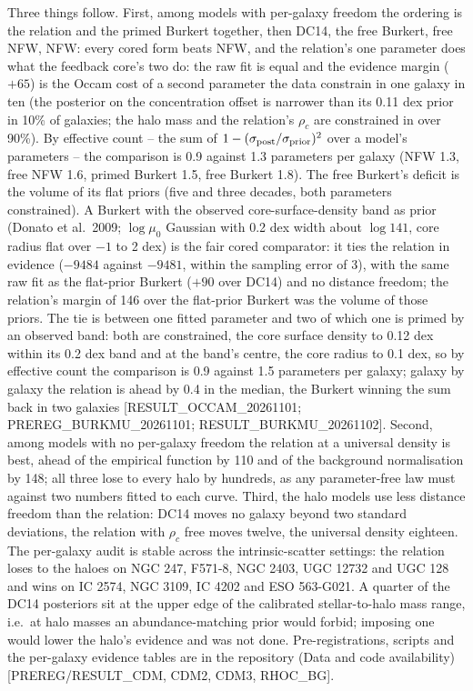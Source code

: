 \documentclass[
  10pt,
]{article}
\begin{document}
Three things follow. First, among models with per-galaxy freedom the ordering is the relation and the primed Burkert together, then DC14, the free Burkert, free NFW, NFW: every cored form beats NFW, and the relation's one parameter does what the feedback core's two do: the raw fit is equal and the evidence margin ($+65$) is the Occam cost of a second parameter the data constrain in one galaxy in ten (the posterior on the concentration offset is narrower than its 0.11 dex prior in 10\% of galaxies; the halo mass and the relation's $\rho_c$ are constrained in over 90\%). By effective count -- the sum of $1-(\sigma_{\rm post}/\sigma_{\rm prior})^2$ over a model's parameters -- the comparison is 0.9 against 1.3 parameters per galaxy (NFW 1.3, free NFW 1.6, primed Burkert 1.5, free Burkert 1.8). The free Burkert's deficit is the volume of its flat priors (five and three decades, both parameters constrained). A Burkert with the observed core-surface-density band as prior (Donato et al.~2009; $\log\mu_0$ Gaussian with 0.2 dex width about $\log 141$, core radius flat over $-1$ to 2 dex) is the fair cored comparator: it ties the relation in evidence ($-9484$ against $-9481$, within the sampling error of 3), with the same raw fit as the flat-prior Burkert ($+90$ over DC14) and no distance freedom; the relation's margin of 146 over the flat-prior Burkert was the volume of those priors. The tie is between one fitted parameter and two of which one is primed by an observed band: both are constrained, the core surface density to 0.12 dex within its 0.2 dex band and at the band's centre, the core radius to 0.1 dex, so by effective count the comparison is 0.9 against 1.5 parameters per galaxy; galaxy by galaxy the relation is ahead by 0.4 in the median, the Burkert winning the sum back in two galaxies {[}RESULT\_OCCAM\_20261101; PREREG\_BURKMU\_20261101; RESULT\_BURKMU\_20261102{]}. Second, among models with no per-galaxy freedom the relation at a universal density is best, ahead of the empirical function by 110 and of the background normalisation by 148; all three lose to every halo by hundreds, as any parameter-free law must against two numbers fitted to each curve. Third, the halo models use less distance freedom than the relation: DC14 moves no galaxy beyond two standard deviations, the relation with $\rho_c$ free moves twelve, the universal density eighteen. The per-galaxy audit is stable across the intrinsic-scatter settings: the relation loses to the haloes on NGC 247, F571-8, NGC 2403, UGC 12732 and UGC 128 and wins on IC 2574, NGC 3109, IC 4202 and ESO 563-G021. A quarter of the DC14 posteriors sit at the upper edge of the calibrated stellar-to-halo mass range, i.e.\ at halo masses an abundance-matching prior would forbid; imposing one would lower the halo's evidence and was not done. Pre-registrations, scripts and the per-galaxy evidence tables are in the repository (Data and code availability) {[}PREREG/RESULT\_CDM, CDM2, CDM3, RHOC\_BG{]}.
\end{document}
